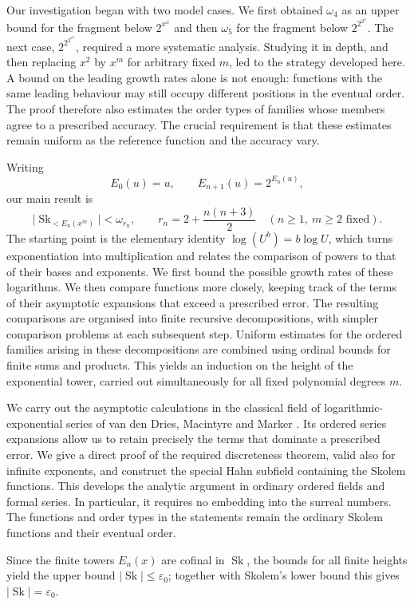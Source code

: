 \documentclass[11pt]{article}
\theoremstyle{definition}
\theoremstyle{remark}
\newcommand{\Sk}{\operatorname{Sk}}
\numberwithin{equation}{section}
\begin{document}
Our investigation began with two model cases.  We first obtained
$\omega_4$ as an upper bound for the fragment below $2^{x^x}$ and then
$\omega_5$ for the fragment below $2^{2^{2^x}}$.  The next case,
$2^{2^{2^{x^2}}}$, required a more systematic analysis.  Studying it in
depth, and then replacing $x^2$ by $x^m$ for arbitrary fixed $m$, led
to the strategy developed here.  A bound on the leading growth rates
alone is not enough: functions with the same leading behaviour may
still occupy different positions in the eventual order.  The proof
therefore also estimates the order types of families whose members
agree to a prescribed accuracy.  The crucial requirement is that these
estimates remain uniform as the reference function and the accuracy
vary.

Writing
\[
 E_0(u)=u,\qquad E_{n+1}(u)=2^{E_n(u)},
\]
our main result is
\[
 \bigl|\Sk_{<E_n(x^m)}\bigr|<\omega_{r_n},
 \qquad r_n=2+\frac{n(n+3)}2
 \quad(n\ge1,\ m\ge2\text{ fixed}).
\]
The starting point is the elementary identity
$\log(U^b)=b\log U$, which turns exponentiation into multiplication
and relates the comparison of powers to that of their bases and
exponents.  We first bound the possible growth rates of these
logarithms.  We then compare functions more closely, keeping track of
the terms of their asymptotic expansions that exceed a prescribed
error.  The resulting comparisons are organised into finite recursive
decompositions, with simpler comparison problems at each subsequent
step.  Uniform estimates for the ordered families arising in these
decompositions are combined using ordinal bounds for finite sums and
products.  This yields an induction on the height of the exponential
tower, carried out simultaneously for all fixed polynomial degrees
$m$.

We carry out the asymptotic calculations in the classical field of
logarithmic-exponential series of van den Dries, Macintyre and Marker
\cite{DMM97,DMM01}. Its ordered series expansions allow us to retain
precisely the terms that dominate a prescribed error. We give a direct
proof of the required discreteness theorem, valid also for infinite
exponents, and construct the special Hahn subfield containing the
Skolem functions. This develops the analytic argument in ordinary
ordered fields and formal series. In particular, it requires no
embedding into the surreal numbers. The functions and order types in
the statements remain the ordinary Skolem functions and their
eventual order.

Since the finite towers $E_n(x)$
are cofinal in $\Sk$, the bounds for all finite heights yield the upper
bound $|\Sk|\le\varepsilon_0$; together with Skolem's lower bound this
gives $|\Sk|=\varepsilon_0$.
\end{document}
